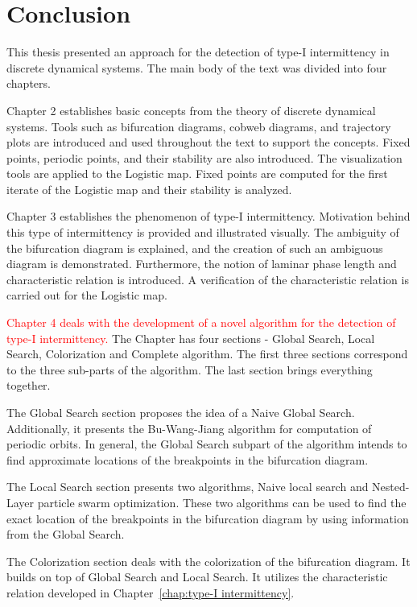 \chapter{Conclusion}

This thesis presented an approach for the detection of type-I intermittency in discrete dynamical systems.
The main body of the text was divided into four chapters.
\par
Chapter 2 establishes basic concepts from the theory of discrete dynamical systems.
Tools such as bifurcation diagrams, cobweb diagrams, and trajectory plots are introduced and used throughout the text to support the concepts.
Fixed points, periodic points, and their stability are also introduced.
The visualization tools are applied to the Logistic map.
Fixed points are computed for the first iterate of the Logistic map and their stability is analyzed.
\par
Chapter 3 establishes the phenomenon of type-I intermittency.
Motivation behind this type of intermittency is provided and illustrated visually.
The ambiguity of the bifurcation diagram is explained, and the creation of such an ambiguous diagram is demonstrated.
Furthermore, the notion of laminar phase length and characteristic relation is introduced.
A verification of the characteristic relation is carried out for the Logistic map.
\par
\textcolor{red}{Chapter 4 deals with the development of a novel algorithm for the detection of type-I intermittency.}
The Chapter has four sections - Global Search, Local Search, Colorization and Complete algorithm.
The first three sections correspond to the three sub-parts of the algorithm.
The last section brings everything together.
\par
The Global Search section proposes the idea of a Naive Global Search.
Additionally, it presents the Bu-Wang-Jiang algorithm for computation of periodic orbits.
In general, the Global Search subpart of the algorithm intends to find approximate locations of the breakpoints in the bifurcation diagram.
\par
The Local Search section presents two algorithms, Naive local search and Nested-Layer particle swarm optimization.
These two algorithms can be used to find the exact location of the breakpoints in the bifurcation diagram by using information from the Global Search.
\par
The Colorization section deals with the colorization of the bifurcation diagram.
It builds on top of Global Search and Local Search.
It utilizes the characteristic relation developed in Chapter~\ref{chap:type-I intermittency}.
